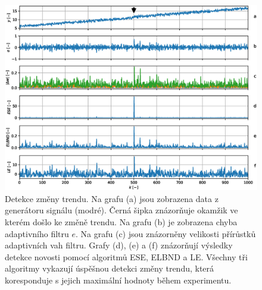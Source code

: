 \begin{figure}[ht!]
    \label{fig:trend_change}
    \centering
    \includegraphics[scale=0.64]{IMG/mdpi/trendchange.eps}
    \caption{Detekce změny trendu. Na grafu (a) jsou zobrazena data z generátoru signálu (modré). Černá šipka znázorňuje okamžik ve kterém došlo ke změně trendu. Na grafu (b) je zobrazena chyba adaptivního filtru $e$. Na grafu (c) jsou znázorněny velikosti přírůstků adaptivních vah filtru. Grafy (d), (e) a (f) znázorňují výsledky detekce novosti pomocí algoritmů ESE, ELBND a LE. Všechny tři algoritmy vykazují úspěšnou detekci změny trendu, která koresponduje s jejich maximální hodnoty během experimentu.}

\end{figure}


